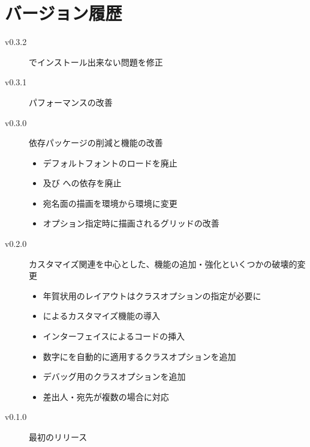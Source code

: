 \documentclass{hagaki-doc}
\begin{document}
\section{バージョン履歴}

\begin{description}
  \item[v0.3.2] でインストール出来ない問題を修正
  \item[v0.3.1] パフォーマンスの改善
  \item[v0.3.0] 依存パッケージの削減と機能の改善
    \leavevmode
    \begin{itemize}
      \item デフォルトフォントのロードを廃止
      \item {}及び への依存を廃止
      \item 宛名面の描画を環境から環境に変更
      \item {}オプション指定時に描画されるグリッドの改善
    \end{itemize}
  \item[v0.2.0] カスタマイズ関連を中心とした、機能の追加・強化といくつかの破壊的変更
    \leavevmode
    \begin{itemize}
      \item 年賀状用のレイアウトはクラスオプションの指定が必要に
      \item {}によるカスタマイズ機能の導入
      \item {}インターフェイスによるコードの挿入
      \item 数字にを自動的に適用するクラスオプションを追加
      \item デバッグ用のクラスオプションを追加
      \item 差出人・宛先が複数の場合に対応
    \end{itemize}
  \item[v0.1.0] 最初のリリース
\end{description}
\end{document}
